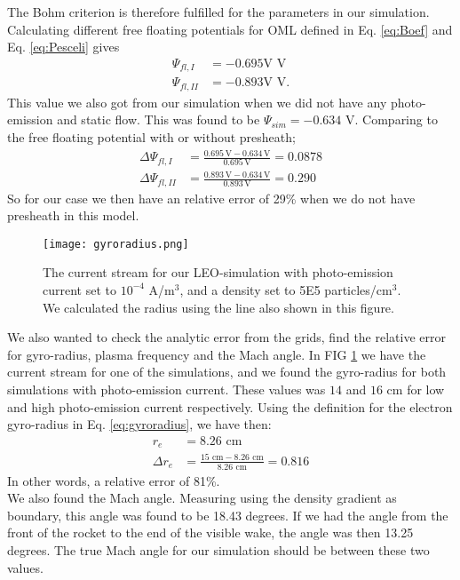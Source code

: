 \documentclass[aip, 
rsi, 
amsmath,
amssymb,
longbibliography,
reprint]{revtex4-1}
\begin{document}
The Bohm criterion is therefore fulfilled for the parameters in our simulation. Calculating different free floating potentials for OML defined in Eq. \ref{eq:Boef} and Eq. \ref{eq:Pesceli} gives
\begin{align*}
\Psi_{fl,I} &= -0.695\text{V} \, \, \text{V}\\
\Psi_{fl,II}&= -0.893 \text{V}\, \, \text{V}.
\end{align*}
This value we also got from our simulation when we did not have any photo-emission and static flow. This was found to be $\Psi_{sim} = -0.634$ V. Comparing to the free floating potential with or without presheath;
\begin{align*}
\Delta \Psi_{fl,I} &= \frac{0.695 \, \text{V} -0.634 \, \text{V}}{0.695 \, \text{V}} = 0.0878\\
\Delta \Psi_{fl,II} &= \frac{0.893 \, \text{V} -0.634 \, \text{V}}{0.893 \, \text{V}} = 0.290
\end{align*}
So for our case we then have an relative error of 29\% when we do not have presheath in this model.\\

\begin{figure}
\texttt{[image: gyroradius.png]}
\caption{The current stream for our LEO-simulation with photo-emission current set to $10^{-4}$ A/m$^3$, and a density set to 5E5 particles/cm$^3$. We calculated the radius using the line also shown in this figure.\label{fig:gyroradius}}
\end{figure}

We also wanted to check the analytic error from the grids, find the relative error for gyro-radius, plasma frequency and the Mach angle. In FIG \ref{fig:gyroradius} we have the current stream for one of the simulations, and we found the gyro-radius for both simulations with photo-emission current. These values was $14$ and $16$ cm for low and high photo-emission current respectively. Using the definition for the electron gyro-radius in Eq. \ref{eq:gyroradius}, we have then:
\begin{align*}
r_e &= 8.26 \, \, \text{cm}\\
\Delta r_e &= \frac{15 \, \, \text{cm}- 8.26 \, \, \text{cm}}{8.26 \, \, \text{cm}} = 0.816
\end{align*}
In other words, a relative error of 81\%.\\

We also found the Mach angle. Measuring using the density gradient as boundary, this angle was found to be 18.43 degrees. If we had the angle from the front of the rocket to the end of the visible wake, the angle was then 13.25 degrees. The true Mach angle for our simulation should be between these two values.\\
\end{document}
